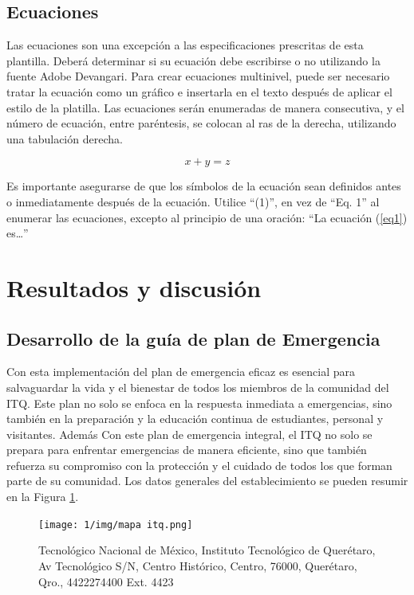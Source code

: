     \subsection{Ecuaciones}
    
    Las ecuaciones son una excepción a las especificaciones prescritas de esta plantilla. 
    Deberá determinar si su ecuación debe escribirse o no utilizando la fuente Adobe Devangari. 
    Para crear ecuaciones multinivel, puede ser necesario tratar la ecuación como un gráfico e insertarla en el texto después de aplicar el estilo de la platilla.
    Las ecuaciones serán enumeradas de manera consecutiva, y el número de ecuación, entre paréntesis, se colocan al ras de la derecha, utilizando una tabulación derecha. 
    
    \begin{equation}
        \label{eq1}
        x + y = z 
    \end{equation}
    
    Es importante asegurarse de que los símbolos de la ecuación sean definidos antes o inmediatamente después de la ecuación. Utilice “(1)”, en vez de “Eq. 1” al enumerar las ecuaciones, excepto al principio de una oración: “La ecuación (\ref{eq1}) es…”
    
    
    \section{Resultados y discusión}
    
    \subsection{Desarrollo de la guía de plan de Emergencia}
    
    Con esta implementación del plan de emergencia eficaz es esencial para salvaguardar la vida y el bienestar de todos los miembros de la comunidad del ITQ. Este plan no solo se enfoca en la respuesta inmediata a emergencias, sino también en la preparación y la educación continua de estudiantes, personal y visitantes. Además Con este plan de emergencia integral, el ITQ no solo se prepara para enfrentar emergencias de manera eficiente, sino que también refuerza su compromiso con la protección y el cuidado de todos los que forman parte de su comunidad.
    Los datos generales del establecimiento se pueden resumir en la Figura \ref{fig:mapa itq}.
    \begin{figure}[H]
        \centering
        \texttt{[image: 1/img/mapa itq.png]}
        \caption{Tecnológico Nacional de México, Instituto Tecnológico de Querétaro, Av Tecnológico S/N, Centro Histórico, Centro, 76000, Querétaro, Qro., 4422274400 Ext. 4423}
        \label{fig:mapa itq}
    \end{figure}
